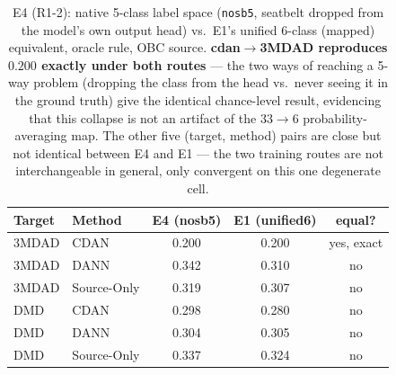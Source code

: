 \begin{table}[t]
\centering
\caption{E4 (R1-2): native 5-class label space (\texttt{nosb5}, seatbelt dropped from the model's own output head) vs.\ E1's unified 6-class (mapped) equivalent, oracle rule, OBC source. \textbf{cdan$\to$3MDAD reproduces $0.200$ exactly under both routes} --- the two ways of reaching a 5-way problem (dropping the class from the head vs.\ never seeing it in the ground truth) give the identical chance-level result, evidencing that this collapse is not an artifact of the $33\to6$ probability-averaging map. The other five (target, method) pairs are close but not identical between E4 and E1 --- the two training routes are not interchangeable in general, only convergent on this one degenerate cell.}
\label{tab:e4_vs_e1}
\footnotesize
\setlength{\tabcolsep}{4pt}
\begin{tabular}{llccc}
\toprule
Target & Method & E4 (nosb5) & E1 (unified6) & equal? \\
\midrule
3MDAD & CDAN & 0.200 & 0.200 & yes, exact \\
3MDAD & DANN & 0.342 & 0.310 & no \\
3MDAD & Source-Only & 0.319 & 0.307 & no \\
DMD & CDAN & 0.298 & 0.280 & no \\
DMD & DANN & 0.304 & 0.305 & no \\
DMD & Source-Only & 0.337 & 0.324 & no \\
\bottomrule
\end{tabular}
\end{table}
